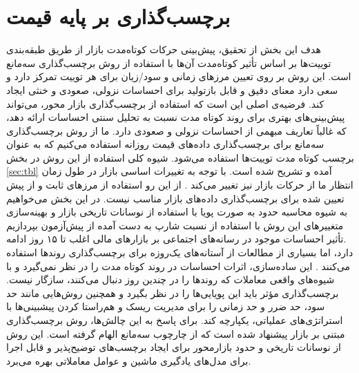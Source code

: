 \section{برچسب‌گذاری بر پایه قیمت}
\label{sec:labeling}
هدف این بخش از تحقیق، پیش‌بینی حرکات کوتاه‌مدت بازار از طریق طبقه‌بندی توییت‌ها بر اساس تأثیر کوتاه‌مدت آن‌ها با استفاده از روش برچسب‌گذاری سه‌مانع است. این روش بر روی تعیین مرزهای زمانی و سود/زیان برای هر توییت تمرکز دارد و سعی دارد معنای دقیق و قابل بازتولید برای احساسات نزولی، صعودی و خنثی ایجاد کند. فرضیه‌ی اصلی این است که استفاده از برچسب‌گذاری بازار محور، می‌تواند پیش‌بینی‌های بهتری برای روند ‌کوتاه‌ مدت نسبت به تحلیل سنتی احساسات ارائه دهد، که غالباً تعاریف مبهمی از احساسات نزولی و صعودی دارد. ما از روش برچسب‌گذاری سه‌مانع \cite{advances_deprado_2018} برای برچسب‌گذاری داده‌های قیمت روزانه استفاده می‌کنیم که به عنوان برچسب کوتاه‌ مدت توییت‌ها استفاده می‌شود. شیوه کلی استفاده از این روش در بخش \ref{sec:tbl} آمده و تشریح شده است. با توجه به تغییرات اساسی بازار در طول زمان انتظار ما از حرکات بازار نیز تغییر می‌کند \cite{ang2012regime}. از این رو استفاده از مرز‌های ثابت و از پیش تعیین شده برای برچسب‌گذاری داده‌های بازار مناسب نیست. در این بخش می‌خواهیم به شیوه محاسبه حدود به صورت پویا با استفاده از نوسانات تاریخی بازار و بهینه‌سازی متغییر‌های این روش با استفاده از نسبت شارپ به دست آمده از پیش‌آزمون بپردازیم \cite{zhang2020deep}.تأثیر احساسات موجود در رسانه‌های اجتماعی بر بازارهای مالی اغلب تا ۱۵ روز ادامه دارد، اما بسیاری از مطالعات از آستانه‌های یک‌روزه برای برچسب‌گذاری روندها استفاده می‌کنند \cite{twitter_vallecruz_2021}. این ساده‌سازی، اثرات احساسات در روند کوتاه‌ مدت را در نظر نمی‌گیرد و با شیوه‌های واقعی معاملات که روندها را در چندین روز دنبال می‌کنند، سازگار نیست. برچسب‌گذاری مؤثر باید این پویایی‌ها را در نظر بگیرد و همچنین روش‌هایی مانند حد سود، حد ضرر و حد زمانی را برای مدیریت ریسک و هم‌راستا کردن پیشبینی‌ها با استراتژی‌های عملیاتی، یکپارچه کند. برای پاسخ به این چالش‌ها، روش برچسب‌گذاری مبتنی بر بازار پیشنهاد شده است که از چارچوب سه‌مانع الهام گرفته است. این روش از نوسانات تاریخی و حدود بازارمحور برای ایجاد برچسب‌های توضیح‌پذیر و قابل اجرا برای مدل‌های یادگیری ماشین و عوامل معاملاتی بهره می‌برد.

